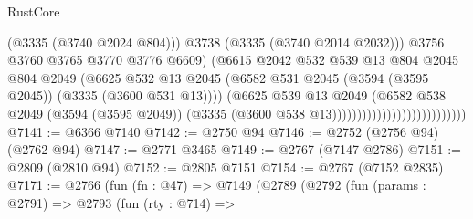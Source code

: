 \begin{lexlean}{RustCore}
\begin{coremodule}
                                                      (@3335 (@3740 @2024 @804)))
                                                    @3738
                                                    (@3335 (@3740 @2014 @2032)))
                                                  @3756
                                                  @3760
                                                  @3765
                                                  @3770
                                                  @3776
                                                  @6609)
                                                (@6615
                                                  @2042
                                                  @532
                                                  @539
                                                  @13
                                                  @804
                                                  @2045
                                                  @804
                                                  @2049
                                                  (@6625
                                                    @532
                                                    @13
                                                    @2045
                                                    (@6582
                                                      @531
                                                      @2045
                                                      (@3594 (@3595 @2045))
                                                      (@3335 (@3600 @531 @13))))
                                                  (@6625
                                                    @539
                                                    @13
                                                    @2049
                                                    (@6582
                                                      @538
                                                      @2049
                                                      (@3594 (@3595 @2049))
                                                      (@3335
                                                        (@3600 @538 @13)))))))))))))))))))))))))))
@7141 := @6366 @7140
@7142 := @2750 @94
@7146 := @2752 (@2756 @94) (@2762 @94)
@7147 := @2771 @3465
@7149 := @2767 (@7147 @2786)
@7151 := @2809 (@2810 @94)
@7152 := @2805 @7151
@7154 := @2767 (@7152 @2835)
@7171 := @2766
    (fun (fn : @47) =>
    @7149
      (@2789
        (@2792
          (fun (params : @2791) =>
          @2793
            (fun (rty : @714) =>

\end{coremodule}
\end{lexlean}
